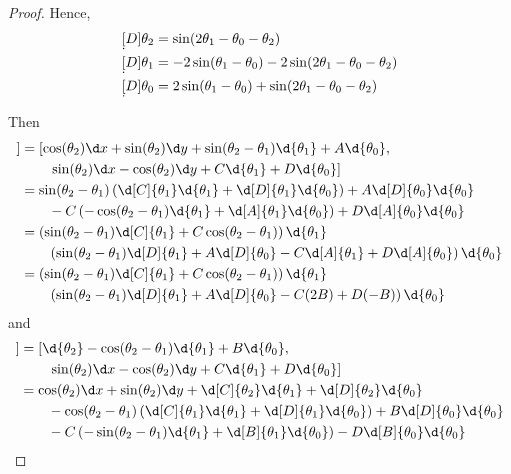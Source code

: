 \documentclass{article}
\begin{document}
\begin{proof}
Hence,
\begin{align*}
\d[D]{\theta_2} & = \sin(2 \theta_1 - \theta_0 - \theta_2)
\\ \d[D]{\theta_1} & = - 2 \sin(\theta_1 - \theta_0) - 2 \sin (2 \theta_1 - \theta_0 - \theta_2)
\\ \d[D]{\theta_0} & = 2 \sin(\theta_1 - \theta_0) + \sin(2 \theta_1 - \theta_0 - \theta_2)
\end{align*}

Then 
\begin{align*}
[X_1, [X_1, X_2]] & = \left[ \cos(\theta_2) \d x  + \sin(\theta_2) \d y  + \sin(\theta_2 - \theta_1)  \d {\theta_1} + A \d {\theta_0}, \right.
\\ & \quad \quad \left.  \sin(\theta_2) \d x  - \cos(\theta_2) \d y + C \d {\theta_1} + D \d {\theta_0} \right]
\\ & = \sin(\theta_2 - \theta_1) \left( \d [C] {\theta_1} \d {\theta_1} + \d [D] {\theta_1} \d {\theta_0} \right)
 + A \d [D] {\theta_0} \d {\theta_0}
\\ & \quad \quad - C \left( -\cos(\theta_2 - \theta_1) \d {\theta_1} + \d [A] {\theta_1} \d {\theta_0} \right) + D \d [A] {\theta_0} \d {\theta_0}
\\ & = \left(  \sin(\theta_2 - \theta_1) \d[C]{\theta_1} + C \cos(\theta_2 - \theta_1) \right)\d {\theta_1}
\\ & \quad \quad \left( \sin(\theta_2 - \theta_1) \d[D]{\theta_1} + A \d[D]{\theta_0} - C \d[A]{\theta_1} + D \d[A]{\theta_0} \right) \d {\theta_0}
\\ & = \left(  \sin(\theta_2 - \theta_1) \d[C]{\theta_1} + C \cos(\theta_2 - \theta_1) \right)\d {\theta_1}
\\ & \quad \quad \left( \sin(\theta_2 - \theta_1) \d[D]{\theta_1} + A \d[D]{\theta_0} - C (2B) + D (-B) \right) \d {\theta_0}
\end{align*}
and
\begin{align*}
[X_2, [X_1, X_2]] & = \left[  \d {\theta_2} - \cos(\theta_2 - \theta_1) \d {\theta_1} + B \d {\theta_0}  ,\right.
\\ & \quad \quad \left.  \sin(\theta_2) \d x  - \cos(\theta_2) \d y + C \d {\theta_1} + D \d {\theta_0} \right]
\\ & = \cos(\theta_2) \d x + \sin(\theta_2) \d y + \d[C]{\theta_2} \d{\theta_1} + \d[D]{\theta_2} \d{\theta_0}
\\ & \quad \quad -\cos(\theta_2 - \theta_1) \left(\d[C]{\theta_1} \d{\theta_1} + \d[D]{\theta_1} \d{\theta_0}\right) + B \d[D]{\theta_0} \d{\theta_0}
\\ & \quad \quad - C \left( -\sin(\theta_2 - \theta_1) \d{\theta_1} + \d[B]{\theta_1} \d{\theta_0} \right) - D \d[B]{\theta_0} \d{\theta_0}

\end{align*}
\end{proof}
\end{document}
